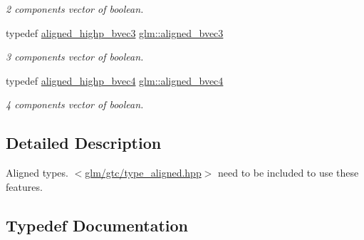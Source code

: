 \begin{DoxyCompactItemize}
\begin{DoxyCompactList}\small\item\em 2 components vector of boolean. \end{DoxyCompactList}\item 
\mbox{\label{group__gtc__type__aligned_ga853a573b554adb2181d9ca23907f8a85}} 
typedef \hyperlink{group__gtc__type__aligned_gadd773554f8ca95a959a269252ad20738}{aligned\+\_\+highp\+\_\+bvec3} \hyperlink{group__gtc__type__aligned_ga853a573b554adb2181d9ca23907f8a85}{glm\+::aligned\+\_\+bvec3}
\begin{DoxyCompactList}\small\item\em 3 components vector of boolean. \end{DoxyCompactList}\item 
\mbox{\label{group__gtc__type__aligned_gaa62e46e15c76ced942cdeba89776c5f6}} 
typedef \hyperlink{group__gtc__type__aligned_ga2e41bbaacd4df8babd91b4e2f21cb8dd}{aligned\+\_\+highp\+\_\+bvec4} \hyperlink{group__gtc__type__aligned_gaa62e46e15c76ced942cdeba89776c5f6}{glm\+::aligned\+\_\+bvec4}
\begin{DoxyCompactList}\small\item\em 4 components vector of boolean. \end{DoxyCompactList}\end{DoxyCompactItemize}


\subsection{Detailed Description}
Aligned types. $<$\hyperlink{gtc_2type__aligned_8hpp}{glm/gtc/type\+\_\+aligned.\+hpp}$>$ need to be included to use these features. 



\subsection{Typedef Documentation}
\mbox{\label{group__gtc__type__aligned_ga0864e6acd440d07a7eff815da8990467}} 
